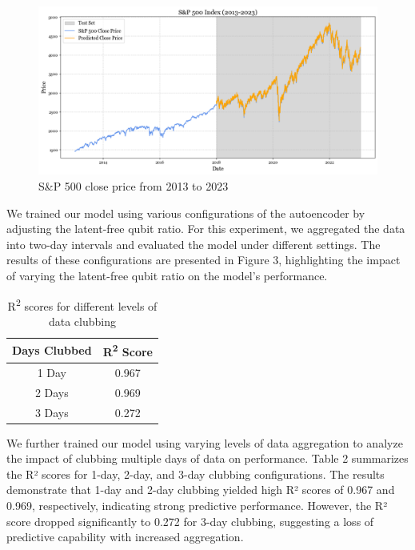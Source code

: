 \documentclass[conference]{IEEEtran}
\begin{document}
\begin{figure}
    \centering
    \includegraphics[width=1\linewidth]{plot.png}
    \caption{S\&P 500 close price from 2013 to 2023}
    \label{fig:enter-label}
\end{figure}

We trained our model using various configurations of the autoencoder by adjusting the latent-free qubit ratio. For this experiment, we aggregated the data into two-day intervals and evaluated the model under different settings. The results of these configurations are presented in Figure 3, highlighting the impact of varying the latent-free qubit ratio on the model's performance.

\begin{table}[ht]
    \centering
    \caption{R\textsuperscript{2} scores for different levels of data clubbing}
    \begin{tabular}{|c|c|}
        \hline
        \textbf{Days Clubbed} & \textbf{R\textsuperscript{2} Score} \\ \hline
        1 Day                & 0.967                               \\ \hline
        2 Days               & 0.969                               \\ \hline
        3 Days               & 0.272                               \\ \hline
    \end{tabular}
    
\end{table}


We further trained our model using varying levels of data aggregation to analyze the impact of clubbing multiple days of data on performance. Table 2 summarizes the R² scores for 1-day, 2-day, and 3-day clubbing configurations. The results demonstrate that 1-day and 2-day clubbing yielded high R² scores of 0.967 and 0.969, respectively, indicating strong predictive performance. However, the R² score dropped significantly to 0.272 for 3-day clubbing, suggesting a loss of predictive capability with increased aggregation.
\end{document}

